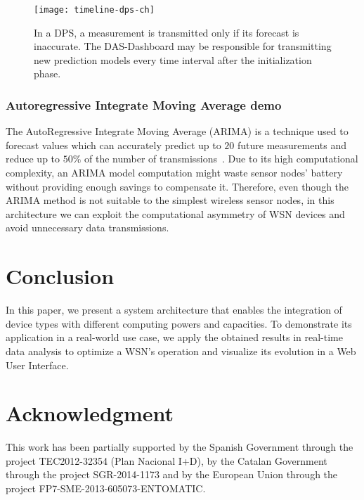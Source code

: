 \documentclass[conference, letterpaper]{IEEEtran}
\newcommand{\dashboard}[1]{DAS-Dashboard}
\begin{document}
\begin{figure}[t]
	\centering
	\texttt{[image: timeline-dps-ch]}
	\caption{In a DPS, a measurement is transmitted only if its
	forecast is inaccurate. The \dashboard{} may be responsible for 
transmitting new prediction models every time interval after the 
initialization phase.}
	\label{fig:timeline-dps-ch}
\end{figure}

\subsubsection{Autoregressive Integrate Moving Average demo}

The AutoRegressive Integrate Moving Average (ARIMA) is a technique used to forecast values which can accurately predict up to $20$ future measurements and reduce up to $50\%$ of the number of transmissions~\cite{Dias2016}. Due to its high computational complexity, an ARIMA model computation might waste sensor nodes' battery without providing enough savings to compensate it. Therefore, even though the ARIMA method is not suitable to the simplest wireless sensor nodes, in this architecture we can exploit the computational asymmetry of WSN devices and avoid unnecessary data transmissions.

\section{Conclusion}
In this paper, we present a system architecture that enables the integration of device types with different computing powers and capacities. To demonstrate its application in a real-world use case, we apply the obtained results in real-time data analysis to optimize a WSN's operation and visualize its evolution in a Web User Interface.


\section*{Acknowledgment}

This work has been partially supported by the Spanish Government through the 
project TEC2012-32354 (Plan Nacional I+D), by the Catalan Government 
through the project SGR-2014-1173 and by the European Union through the 
project FP7-SME-2013-605073-ENTOMATIC.



\end{document}
